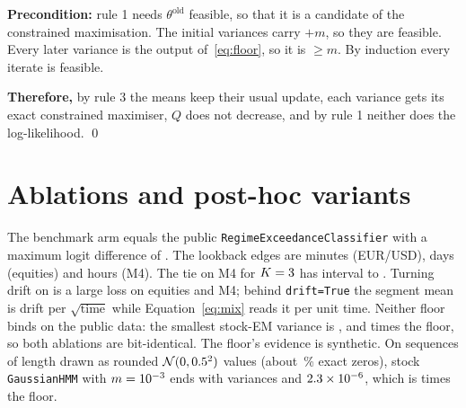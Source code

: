\documentclass{article}
\begin{document}
\textbf{Precondition:} rule 1 needs $\theta^{\text{old}}$ feasible, so that it is a candidate of the constrained maximisation.
The initial variances carry $+m$, so they are feasible.
Every later variance is the output of~\eqref{eq:floor}, so it is $\ge m$.
By induction every iterate is feasible.

\textbf{Therefore,} by rule 3 the means keep their usual update, each variance gets its exact constrained maximiser, $Q$ does not decrease, and by rule 1 neither does the log-likelihood. \qed

\section{Ablations and post-hoc variants}
\label{app:variants}

The benchmark arm equals the public \texttt{RegimeExceedanceClassifier} with a maximum logit difference of \nFxApiDiff.
The lookback edges are \nCfgFxEdges{} minutes (EUR/USD), \nCfgEqEdges{} days (equities) and \nCfgMfEdges{} hours (M4).
The tie on M4 for $K=3$ has interval \nMfKthreeLo{} to \nMfKthreeHi.
Turning drift on is a large loss on equities and M4; behind \texttt{drift=True} the segment mean is drift per $\sqrt{\text{time}}$ while Equation~\eqref{eq:mix} reads it per unit time.
Neither floor binds on the public data: the smallest stock-EM variance is \nFxCollapseRatio, \nEqCollapseRatio{} and \nMfCollapseRatio{} times the floor, so both ablations are bit-identical.
The floor's evidence is synthetic.
On \nCfgReproSeqs{} sequences of length \nCfgReproLen{} drawn as rounded $\mathcal N(0,0.5^2)$ values (about \nReproZeroShare\,\% exact zeros), stock \texttt{GaussianHMM} with $m=10^{-3}$ ends with variances \nReproVarBig{} and $2.3\times10^{-6}$, which is \nReproFloorFrac{} times the floor.
\end{document}
